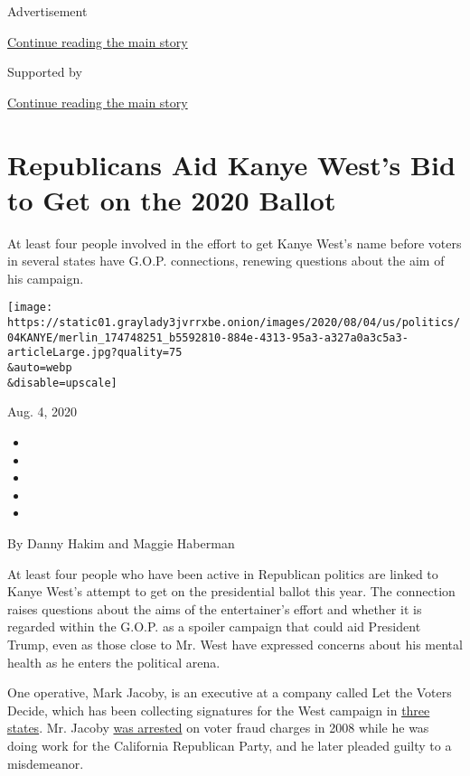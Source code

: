 Advertisement

\protect\hyperlink{after-top}{Continue reading the main story}

Supported by

\protect\hyperlink{after-sponsor}{Continue reading the main story}

\hypertarget{republicans-aid-kanye-wests-bid-to-get-on-the-2020-ballot}{%
\section{Republicans Aid Kanye West's Bid to Get on the 2020
Ballot}\label{republicans-aid-kanye-wests-bid-to-get-on-the-2020-ballot}}

At least four people involved in the effort to get Kanye West's name
before voters in several states have G.O.P. connections, renewing
questions about the aim of his campaign.

\texttt{[image: https://static01.graylady3jvrrxbe.onion/images/2020/08/04/us/politics/04KANYE/merlin\_174748251\_b5592810-884e-4313-95a3-a327a0a3c5a3-articleLarge.jpg?quality=75\\\&auto=webp\\\&disable=upscale]}

Aug. 4, 2020

\begin{itemize}
\item
\item
\item
\item
\item
\end{itemize}

By Danny Hakim and Maggie Haberman

At least four people who have been active in Republican politics are
linked to Kanye West's attempt to get on the presidential ballot this
year. The connection raises questions about the aims of the
entertainer's effort and whether it is regarded within the G.O.P. as a
spoiler campaign that could aid President Trump, even as those close to
Mr. West have expressed concerns about his mental health as he enters
the political arena.

One operative, Mark Jacoby, is an executive at a company called Let the
Voters Decide, which has been collecting signatures for the West
campaign in
\href{https://www.tmz.com/2020/08/02/kanye-makes-play-to-get-on-presidential-ballot-in-ohio/}{three
states}. Mr. Jacoby
\href{https://www.cbsnews.com/news/signature-gatherer-arrested-in-voter-fraud/}{was
arrested} on voter fraud charges in 2008 while he was doing work for the
California Republican Party, and he later pleaded guilty to a
misdemeanor.

